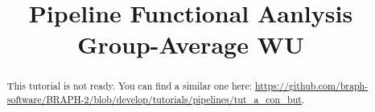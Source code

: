 \documentclass[justified]{tufte-handout}
\title{Pipeline Functional Aanlysis Group-Average WU}
\begin{document}
\maketitle

\begin{abstract}
\noindent
This tutorial is not ready. You can find a similar one here: \url{https://github.com/braph-software/BRAPH-2/blob/develop/tutorials/pipelines/tut_a_con_but}.
\end{abstract}
\end{document}

